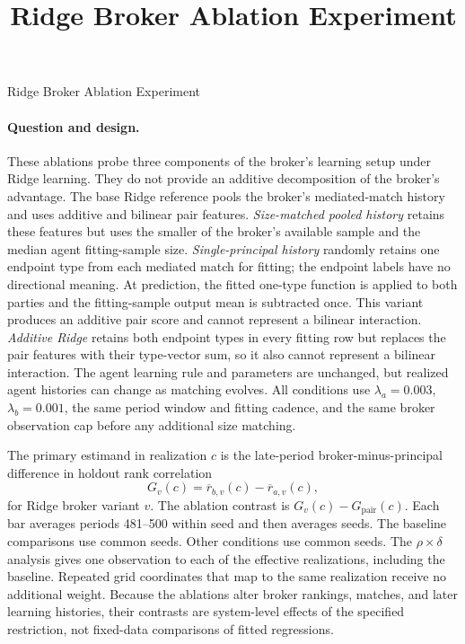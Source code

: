 \documentclass[11pt]{article}
\title{Ridge Broker Ablation Experiment}
\author{}
\date{}
\begin{document}
\renewcommand{\thefigure}{RA\arabic{figure}}
\renewcommand{\thetable}{RA\arabic{table}}
\begin{center}
{\LARGE Ridge Broker Ablation Experiment}
\end{center}
\vspace{0.75em}

\paragraph{Question and design.}
These ablations probe three components of the broker's learning setup under
Ridge learning. They do not provide an additive decomposition of the broker's
advantage. The base Ridge reference pools the broker's mediated-match
history and uses additive and bilinear pair features. \emph{Size-matched pooled
history} retains these features but uses the smaller of the broker's available
sample and the median agent fitting-sample size. \emph{Single-principal history}
randomly retains one endpoint type from each mediated match for fitting; the
endpoint labels have no directional meaning. At prediction, the fitted
one-type function is applied to both parties and the fitting-sample output mean
is subtracted once. This variant produces an additive pair score and cannot
represent a bilinear interaction. \emph{Additive Ridge} retains both endpoint
types in every fitting row but replaces the pair features with their
type-vector sum, so it also cannot represent a bilinear interaction. The agent
learning rule and parameters are unchanged, but realized agent histories can
change as matching evolves. All conditions use $\lambda_a=0.003$,
$\lambda_b=0.001$, the same period window and fitting cadence, and the same
broker observation cap before any additional size matching.

The primary estimand in realization $c$ is the late-period broker-minus-principal
difference in holdout rank correlation
\[
G_v(c)=\overline r_{b,v}(c)-\overline r_{a,v}(c),
\]
for Ridge broker variant $v$. The ablation contrast is
$G_v(c)-G_{\mathrm{pair}}(c)$. Each bar averages periods 481--500 within seed
and then averages seeds. The baseline comparisons use 
common seeds. Other conditions use  common seeds. The
$\rho\times\delta$ analysis gives one observation to each of the
 effective realizations, including the baseline. Repeated
grid coordinates that map to the same realization receive no additional
weight. Because the ablations alter broker rankings, matches, and later
learning histories, their contrasts are system-level effects of the specified
restriction, not fixed-data comparisons of fitted regressions.
\end{document}
